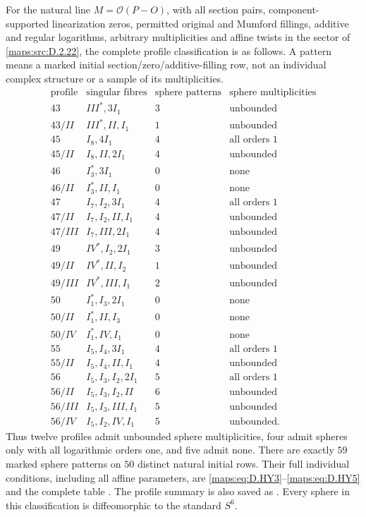 \begin{corollary}
For the natural line $M=\mathcal O(P-O)$, with all section pairs,
component-supported linearization zeros, permitted original and
Mumford fillings, additive and regular logarithms, arbitrary
multiplicities and affine twists in the sector of \ref{maps:src:D.2.22}, the
complete profile classification is as follows. A pattern means
a marked initial section/zero/additive-filling row, not an
individual complex structure or a sample of its multiplicities.
\[
\begin{array}{c|l|r|l}
\text{profile}&\text{singular fibres}&\text{sphere patterns}
                     &\text{sphere multiplicities}\\\hline
43&III^*,3I_1&3&\text{unbounded}\\
43/II&III^*,II,I_1&1&\text{unbounded}\\
45&I_8,4I_1&4&\text{all orders }1\\
45/II&I_8,II,2I_1&4&\text{unbounded}\\
46&I_3^*,3I_1&0&\text{none}\\
46/II&I_3^*,II,I_1&0&\text{none}\\
47&I_7,I_2,3I_1&4&\text{all orders }1\\
47/II&I_7,I_2,II,I_1&4&\text{unbounded}\\
47/III&I_7,III,2I_1&4&\text{unbounded}\\
49&IV^*,I_2,2I_1&3&\text{unbounded}\\
49/II&IV^*,II,I_2&1&\text{unbounded}\\
49/III&IV^*,III,I_1&2&\text{unbounded}\\
50&I_1^*,I_3,2I_1&0&\text{none}\\
50/II&I_1^*,II,I_3&0&\text{none}\\
50/IV&I_1^*,IV,I_1&0&\text{none}\\
55&I_5,I_4,3I_1&4&\text{all orders }1\\
55/II&I_5,I_4,II,I_1&4&\text{unbounded}\\
56&I_5,I_3,I_2,2I_1&5&\text{all orders }1\\
56/II&I_5,I_3,I_2,II&6&\text{unbounded}\\
56/III&I_5,I_3,III,I_1&5&\text{unbounded}\\
56/IV&I_5,I_2,IV,I_1&5&\text{unbounded}.
\end{array}                                                  \tag{D.ST13}\label{maps:eq:D.ST13}
\]
Thus twelve profiles admit unbounded sphere multiplicities,
four admit spheres only with all logarithmic orders one, and
five admit none. There are exactly $59$ marked sphere patterns
on $50$ distinct natural initial rows. Their full individual
conditions, including all affine parameters, are \eqref{maps:eq:D.HY3}--\eqref{maps:eq:D.HY5}
and the complete table
.
The profile summary is also saved as
.
Every sphere in this classification is diffeomorphic to the
standard $S^6$.

\end{corollary}


